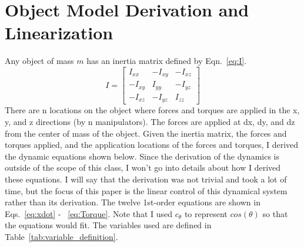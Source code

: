 \documentclass{article}
\begin{document}
\section{Object Model Derivation and Linearization}
Any object of mass $m$ has an inertia matrix defined by Eqn.~\ref{eq:I}. 
\begin{equation}\label{eq:I}
I=
  \begin{bmatrix}
    I_{xx} & -I_{xy} & -I_{xz} \\
    -I_{xy} & I_{yy} & -I_{yz} \\
    -I_{xz} & -I_{yz} & I_{zz}
  \end{bmatrix}
\end{equation}
There are n locations on the object where forces and torques are applied in the x, y, and z directions (by n manipulators). The forces are applied at dx, dy, and dz from the center of mass of the object. Given the inertia matrix, the forces and torques applied, and the application locations of the forces and torques, I derived the dynamic equations shown below. Since the derivation of the dynamics is outside of the scope of this class, I won't go into details about how I derived these equations. I will say that the derivation was not trivial and took a lot of time, but the focus of this paper is the linear control of this dynamical system rather than its derivation. The twelve 1st-order equations are shown in Eqs.~\ref{eq:xdot} - ~\ref{eq:Torque}. Note that I used $c_{\theta}$ to represent $cos(\theta)$ so that the equations would fit. The variables used are defined in Table~\ref{tab:variable_definition}.
\noindent
\end{document}

